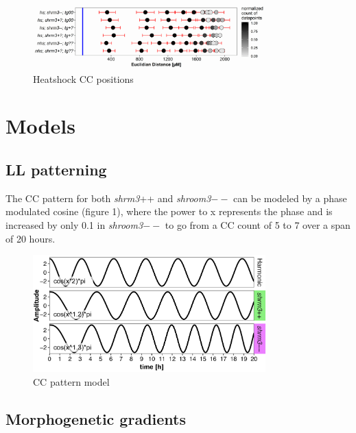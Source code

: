 \documentclass[11pt,singlespacinge,twoside]{reedthesis} %
\begin{document}
\begin{figure}

{\centering \includegraphics[width=0.8\textwidth]{figures/results/06_rescues/shrm3/cc_positions} 

}

\caption[Heatshock CC positions]{Heatshock CC positions}\label{fig:supphscc}
\end{figure}
\hypertarget{models}{%
\chapter{Models}\label{models}}

\hypertarget{ll-patterning}{%
\section{LL patterning}\label{ll-patterning}}

The CC pattern for both \emph{shrm3}++ and \emph{shroom3}\(--\) can be modeled by a phase modulated cosine (figure 1), where the power to x represents the phase and is increased by only 0.1 in \emph{shroom3}\(--\) to go from a CC count of 5 to 7 over a span of 20 hours.


\begin{figure}

{\centering \includegraphics[width=0.8\textwidth]{figures/supp/cc_model} 

}

\caption[CC pattern model]{CC pattern model}\label{fig:supccpmodel}
\end{figure}
\hypertarget{morphogenetic-gradients}{%
\section{Morphogenetic gradients}\label{morphogenetic-gradients}}
\end{document}
